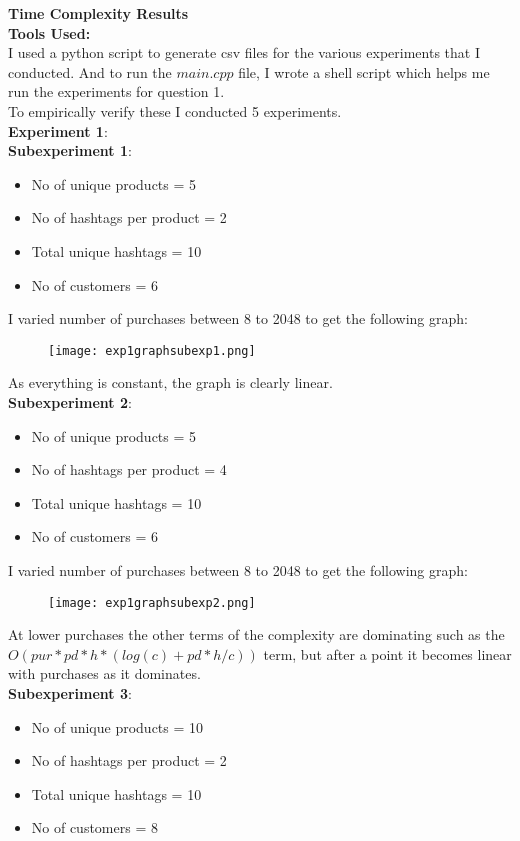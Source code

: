 \documentclass[12pt]{article}
\begin{document}
\textbf{Time Complexity Results}\\
\textbf{Tools Used:}\\
I used a python script to generate csv files for the various experiments that I conducted. And to run the $main.cpp$ file, I wrote a shell script which helps me run the experiments for question 1.\\
To empirically verify these I conducted 5 experiments.\\
\textbf{Experiment 1}:\\
\textbf{Subexperiment 1}:\\
\begin{itemize}
    \item No of unique products = 5
    \item No of hashtags per product = 2
    \item Total unique hashtags = 10
    \item No of customers = 6
\end{itemize}
I varied number of purchases between 8 to 2048 to get the following graph:
\begin{figure}[h]
    \centering
    \texttt{[image: exp1graphsubexp1.png]}
\end{figure}
As everything is constant, the graph is clearly linear.\\ \newpage
\textbf{Subexperiment 2}:\\
\begin{itemize}
    \item No of unique products = 5
    \item No of hashtags per product = 4
    \item Total unique hashtags = 10
    \item No of customers = 6
\end{itemize}
I varied number of purchases between 8 to 2048 to get the following graph:
\begin{figure}[h]
    \centering
    \texttt{[image: exp1graphsubexp2.png]}
\end{figure}
At lower purchases the other terms of the complexity are dominating such as the $O(pur*pd*h*(log(c) + pd*h/c))$ term, but after a point it becomes linear with purchases as it dominates.\\ \newpage
\textbf{Subexperiment 3}:\\
\begin{itemize}
    \item No of unique products = 10
    \item No of hashtags per product = 2
    \item Total unique hashtags = 10
    \item No of customers = 8
\end{itemize}
\end{document}

